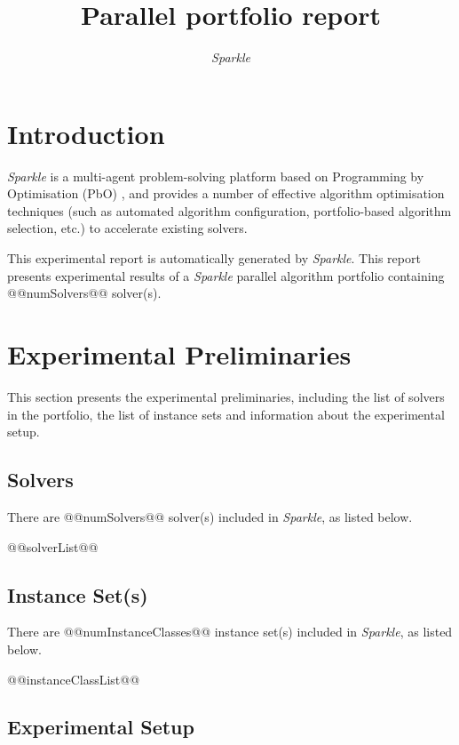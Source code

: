 \documentclass[british]{article}
\title{Parallel portfolio report}
\author{ \emph{Sparkle} }
\begin{document}
\maketitle %

\section{Introduction}
\label{sec:Introduction}

\emph{Sparkle} \cite{Hoos15} is a multi-agent problem-solving platform based on Programming by Optimisation (PbO) \cite{Hoos12}, and provides a number of effective algorithm optimisation techniques (such as automated algorithm configuration, portfolio-based algorithm selection, etc.) to accelerate existing solvers.

This experimental report is automatically generated by \emph{Sparkle}. This report presents experimental results of a \emph{Sparkle} parallel algorithm portfolio containing @@numSolvers@@ solver(s).

\section{Experimental Preliminaries}
\label{sec:Experimental_Preliminaries}

This section presents the experimental preliminaries, including the list of solvers in the portfolio, the list of instance sets and information about the experimental setup.

\subsection{Solvers}
\label{sec:Solvers}
There are @@numSolvers@@ solver(s) included in \emph{Sparkle}, as listed below.

\begin{enumerate}[nolistsep] 
@@solverList@@
\end{enumerate}

\subsection{Instance Set(s)}
\label{sec:Instance_Sets}
There are @@numInstanceClasses@@ instance set(s) included in \emph{Sparkle}, as listed below.

\begin{enumerate}
@@instanceClassList@@
\end{enumerate}

\subsection{Experimental Setup}
\label{sec:Experimental_Setup}
\end{document}
